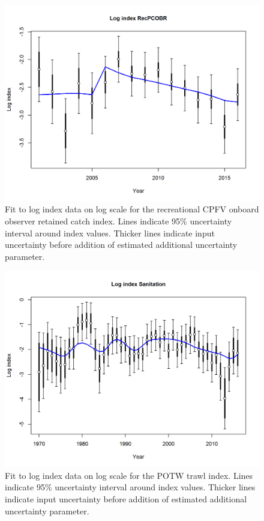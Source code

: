 \documentclass[12pt,]{article}
\begin{document}
\begin{figure}[htbp]
\centering
\includegraphics{r4ss/plots_mod1/index5_logcpuefit_RecPCOBR.png}
\caption{Fit to log index data on log scale for the recreational CPFV
onboard observer retained catch index. Lines indicate 95\% uncertainty
interval around index values. Thicker lines indicate input uncertainty
before addition of estimated additional uncertainty parameter.
\label{fig:Fleet12_index5_logcpuefit_RecPCOBR}}
\end{figure}

\begin{figure}[htbp]
\centering
\includegraphics{r4ss/plots_mod1/index5_logcpuefit_Sanitation.png}
\caption{Fit to log index data on log scale for the POTW trawl index.
Lines indicate 95\% uncertainty interval around index values. Thicker
lines indicate input uncertainty before addition of estimated additional
uncertainty parameter. \label{fig:index5_logcpuefit_Sanitation}}
\end{figure}
\end{document}
